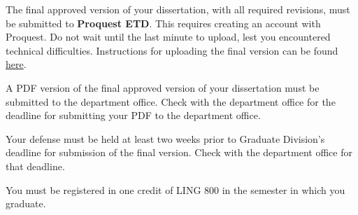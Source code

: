 \documentclass[
]{book}
\begin{document}
The final approved version of your dissertation, with all required revisions, must be submitted to \textbf{Proquest ETD}. This requires creating an account with Proquest. Do not wait until the last minute to upload, lest you encountered technical difficulties. Instructions for uploading the final version can be found \href{https://manoa.hawaii.edu/graduate/proquest-etd-submission-publication/}{here}.

A PDF version of the final approved version of your dissertation must be submitted to the department office. Check with the department office for the deadline for submitting your PDF to the department office.

Your defense must be held at least two weeks prior to Graduate Division's deadline for submission of the final version. Check with the department office for that deadline.

You must be registered in one credit of LING 800 in the semester in which you graduate.

  
\end{document}
